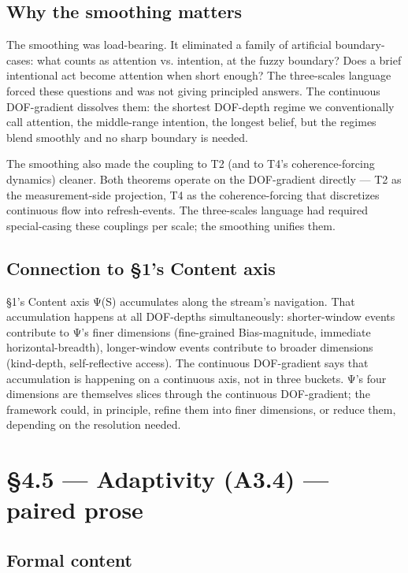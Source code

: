 \documentclass[11pt, openany]{book}
\newcommand{\sectionbreak}{\clearpage}
\begin{document}
\subsection{Why the smoothing matters}

The smoothing was load-bearing. It eliminated a family of artificial boundary-cases: what counts as attention vs. intention, at the fuzzy boundary? Does a brief intentional act become attention when short enough? The three-scales language forced these questions and was not giving principled answers. The continuous DOF-gradient dissolves them: the shortest DOF-depth regime we conventionally call attention, the middle-range intention, the longest belief, but the regimes blend smoothly and no sharp boundary is needed.

The smoothing also made the coupling to T2 (and to T4's coherence-forcing dynamics) cleaner. Both theorems operate on the DOF-gradient directly --- T2 as the measurement-side projection, T4 as the coherence-forcing that discretizes continuous flow into refresh-events. The three-scales language had required special-casing these couplings per scale; the smoothing unifies them.

\subsection{Connection to §1's Content axis}

§1's Content axis Ψ(S) accumulates along the stream's navigation. That accumulation happens at all DOF-depths simultaneously: shorter-window events contribute to Ψ's finer dimensions (fine-grained Bias-magnitude, immediate horizontal-breadth), longer-window events contribute to broader dimensions (kind-depth, self-reflective access). The continuous DOF-gradient says that accumulation is happening on a continuous axis, not in three buckets. Ψ's four dimensions are themselves slices through the continuous DOF-gradient; the framework could, in principle, refine them into finer dimensions, or reduce them, depending on the resolution needed.

\sectionbreak

\section{§4.5 --- Adaptivity (A3.4) --- paired prose}

\subsection{Formal content}
\end{document}
